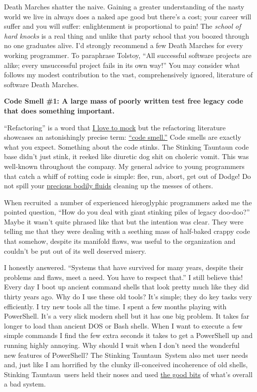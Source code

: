 Death Marches shatter the naive. Gaining a greater understanding of the
nasty world we live in always does a naked ape good but there's a cost;
your career will suffer and you will suffer: enlightenment is
proportional to pain! The \emph{school of hard knocks} is a real thing and
unlike that party school that you boozed through no one graduates alive.
I'd strongly recommend a few Death Marches for every working programmer.
To paraphrase Tolstoy, ``All successful software projects are alike;
every unsuccessful project fails in its own way!'' You may consider what
follows my modest contribution to the vast, comprehensively ignored,
literature of software Death Marches.

\medskip
\noindent\textbf{Code Smell \#1: A large mass of poorly written test free legacy
code that does something important.}
\medskip

``Refactoring'' is a word that
\href{https://bakerjd99.wordpress.com/2010/01/28/why-code-when-you-can-steal/}{I
love to mock} but the refactoring literature showcases an astonishingly
precise term: \href{http://en.wikipedia.org/wiki/Code_smell}{``code
smell.''} Code smells are exactly what you expect. Something about the
code stinks. The Stinking Tauntaun code base didn't just stink, it
reeked like diuretic dog shit on choleric vomit. This was well-known
throughout the company. My general advice to young programmers that
catch a whiff of rotting code is simple: flee, run, abort, get out of
Dodge! Do not spill your
\href{https://www.youtube.com/watch?v=N1KvgtEnABY}{precious bodily
fluids} cleaning up the messes of others.

When recruited~a number of experienced hieroglyphic programmers asked me
the pointed question, ``How do you deal with giant stinking piles of
legacy doo-doo?'' Maybe it wasn't quite phrased like that but the
intention was clear. They were telling me that they were dealing with a
seething mass of half-baked crappy code that somehow, despite its
manifold flaws, was useful to the organization and couldn't be put out
of its well deserved misery.

I honestly answered. ``Systems that have survived for many years,
despite their problems and flaws, meet a need. You have to respect
that.'' I still believe this! Every day I boot up ancient command
shells that look pretty much like they did thirty years ago. Why do I
use these old tools? It's simple; they do key tasks very efficiently. I
try new tools all the time. I spent a few months playing with
PowerShell. It's a very slick modern shell but it has one big problem.
It takes far longer to load than ancient DOS or Bash shells. When I want
to execute a few simple commands I find the few extra seconds it takes
to get a PowerShell up and running highly annoying. Why should I wait
when I don't need the wonderful new features of PowerShell? The
Stinking Tauntaun~System also met user needs and, just like I am
horrified by the clunky ill-conceived incoherence of old shells,
Stinking Tauntaun~users held their noses and used
\href{https://www.youtube.com/watch?v=wPiHQ37gXnE}{the good bits} of
what's overall a bad system.

